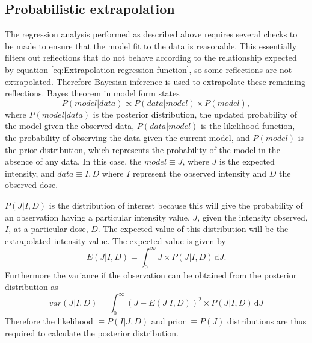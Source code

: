 \subsection{Probabilistic extrapolation}
\label{sub:Probabilistic extrapolation}
The regression analysis performed as described above requires several checks to be made to ensure that the model fit to the data is reasonable.
This essentially filters out reflections that do not behave according to the relationship expected by equation \ref{eq:Extrapolation regression function}, so some reflections are not extrapolated.
Therefore Bayesian inference is used to extrapolate these remaining reflections.
Bayes theorem in model form states
\begin{equation}
P(model|data) \propto P(data | model) \times P(model),
\label{eq:Bayesian Theorem in model form}
\end{equation}
where $P(model|data)$ is the posterior distribution, the updated probability of the model given the observed data, $P(data|model)$ is the likelihood function, the probability of observing the data given the current model, and $P(model)$ is the prior distribution, which represents the probability of the model in the absence of any data.
In this case, the $model \equiv J$, where $J$ is the expected intensity, and $data \equiv I, D$ where $I$ represent the observed intensity and $D$ the observed dose.

$P(J|I,D)$ is the distribution of interest because this will give the probability of an observation having a particular intensity value, $J$, given the intensity observed, $I$, at a particular dose, $D$.
The expected value of this distribution will be the extrapolated intensity value.
The expected value is given by
\begin{equation}
    E(J|I, D) = \int_0^{\infty} J \times P(J|I,D)\, \mathrm{d}J.
    \label{eq:Expected intensity value - Extrapolation method}
\end{equation}
Furthermore the variance if the observation can be obtained from the posterior distribution as
\begin{equation}
    var(J|I, D) = \int_0^{\infty}  \left( J - E(J|I, D) \right)^2 \times P(J|I,D)\, \mathrm{d}J
    \label{eq:Variance of intensity value - Extrapolation method}
\end{equation}
Therefore the likelihood $\equiv P(I | J, D)$ and prior $\equiv P(J)$ distributions are thus required to calculate the posterior distribution.

